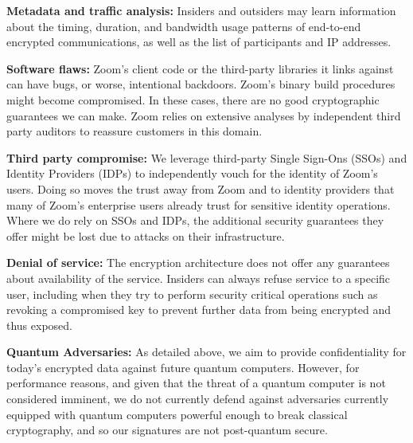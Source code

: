 \begin{description}
	\item {\bf Metadata and traffic analysis:} Insiders and outsiders may learn information about
		the timing, duration, and bandwidth usage patterns of end-to-end encrypted communications,
		as well as the list of participants and IP addresses.
	\item {\bf Software flaws:} Zoom's client code or the third-party libraries it links against can
		have bugs, or worse, intentional backdoors. Zoom's binary build procedures might become
		compromised. In these cases, there are no good cryptographic guarantees we can make. Zoom
		relies on extensive analyses by independent third party auditors to reassure customers in
		this domain.
	\item {\bf Third party compromise:} We leverage third-party Single Sign-Ons (SSOs) and Identity
		Providers (IDPs) to independently vouch for the identity of Zoom's users. Doing so moves
		the trust away from Zoom and to identity providers that many of Zoom's enterprise users
		already trust for sensitive identity operations. Where we do rely on SSOs and IDPs, the
		additional security guarantees they offer might be lost due to attacks on their
		infrastructure.
	\item {\bf Denial of service:} The encryption architecture does not offer any guarantees about
		availability of the service. Insiders can always refuse service to a specific user,
		including when they try to perform security critical operations such as revoking a
		compromised key to prevent further data from being encrypted and thus exposed.
	\item{\bf Quantum Adversaries:} As detailed above, we aim to provide confidentiality for today's
		encrypted data against future quantum computers. However, for performance reasons, and given
		that the threat of a quantum computer is not considered imminent, we do not currently defend
		against adversaries currently equipped with quantum computers powerful enough to break
		classical cryptography, and so our signatures are not post-quantum secure.
\end{description}

